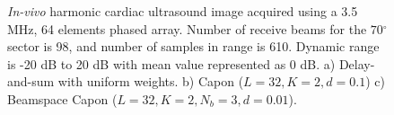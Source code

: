 \documentclass[journal]{IEEEtran}
\newcommand{\degree}{\ensuremath{^\circ}}
\begin{document}
\begin{figure}[!t]
\centerline{
\hfil
{}
\hfil
{}}
\caption{\textit{In-vivo} harmonic cardiac ultrasound image acquired using a 3.5 MHz, 64 elements phased array. Number of receive beams for the $70\degree$ sector is 98, and number of samples in range is 610. Dynamic range is -20 dB to 20 dB with mean value represented as 0 dB. a) Delay-and-sum with uniform weights. b) Capon ($L=32, K=2, d=0.1$) c) Beamspace Capon ($L=32, K=2, N_b=3, d=0.01$).}
\label{fig:invivo}
\end{figure}
\end{document}
